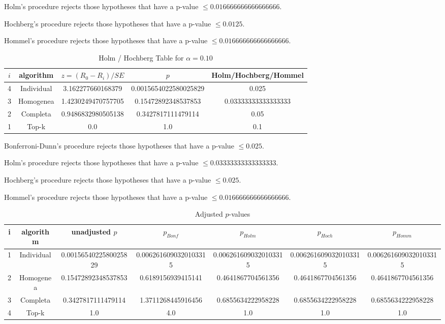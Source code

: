 \documentclass[a4paper,10pt]{article}
\begin{document}
\begin{landscape}
Holm's procedure rejects those hypotheses that have a p-value $\le0.016666666666666666$.


Hochberg's procedure rejects those hypotheses that have a p-value $\le0.0125$.


Hommel's procedure rejects those hypotheses that have a p-value $\le0.016666666666666666$.


\begin{table}[!htp]
\centering\tiny
\caption{Holm / Hochberg Table for $\alpha=0.10$}
\begin{tabular}{ccccc}
$i$&algorithm&$z=(R_0 - R_i)/SE$&$p$&Holm/Hochberg/Hommel\\
\hline
4&Individual&3.162277660168379&0.0015654022580025829&0.025\\
3&Homogenea&1.4230249470757705&0.15472892348537853&0.03333333333333333\\
2&Completa&0.9486832980505138&0.3427817111479114&0.05\\
1&Top-k&0.0&1.0&0.1\\
\hline
\end{tabular}
\end{table}
Bonferroni-Dunn's procedure rejects those hypotheses that have a p-value $\le0.025$.


Holm's procedure rejects those hypotheses that have a p-value $\le0.03333333333333333$.


Hochberg's procedure rejects those hypotheses that have a p-value $\le0.025$.


Hommel's procedure rejects those hypotheses that have a p-value $\le0.016666666666666666$.


\begin{table}[!htp]
\centering\tiny
\caption{Adjusted $p$-values}
\begin{tabular}{ccccccc}
i&algorithm&unadjusted $p$&$p_{Bonf}$&$p_{Holm}$&$p_{Hoch}$&$p_{Homm}$\\
\hline
1&Individual&0.0015654022580025829&0.0062616090320103315&0.0062616090320103315&0.0062616090320103315&0.0062616090320103315\\
2&Homogenea&0.15472892348537853&0.6189156939415141&0.4641867704561356&0.4641867704561356&0.4641867704561356\\
3&Completa&0.3427817111479114&1.3711268445916456&0.6855634222958228&0.6855634222958228&0.6855634222958228\\
4&Top-k&1.0&4.0&1.0&1.0&1.0\\
\hline
\end{tabular}
\end{table}


\end{landscape}
\end{document}

